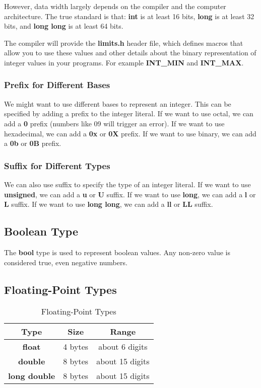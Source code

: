 \documentclass[a4paper,12pt]{article}
\begin{document}
However, data width largely depends on the compiler and the computer architecture.
The true standard is that: \textbf{int} is at least 16 bits, \textbf{long} is at least 32 bits, and \textbf{long long} is at least 64 bits.

The compiler will provide the \textbf{limits.h} header file, which defines macros that allow you to use these values and other details about the binary representation of integer values in your programs.
For example \textbf{INT\_MIN} and \textbf{INT\_MAX}.

\subsubsection{Prefix for Different Bases}

We might want to use different bases to represent an integer.
This can be specified by adding a prefix to the integer literal.
If we want to use octal, we can add a \textbf{0} prefix (numbers like 09 will trigger an error).
If we want to use hexadecimal, we can add a \textbf{0x} or \textbf{0X} prefix.
If we want to use binary, we can add a \textbf{0b} or \textbf{0B} prefix.

\subsubsection{Suffix for Different Types}

We can also use suffix to specify the type of an integer literal.
If we want to use \textbf{unsigned}, we can add a \textbf{u} or \textbf{U} suffix.
If we want to use \textbf{long}, we can add a \textbf{l} or \textbf{L} suffix.
If we want to use \textbf{long long}, we can add a \textbf{ll} or \textbf{LL} suffix.

\subsection{Boolean Type}

The \textbf{bool} type is used to represent boolean values.
Any non-zero value is considered true, even negative numbers.

\subsection{Floating-Point Types}

\begin{table}[H]
	\centering
	\begin{tabular}{|c|c|c|}
		\hline
		Type & Size & Range \\
		\hline
		\textbf{float} & 4 bytes & about 6 digits \\
		\hline
		\textbf{double} & 8 bytes & about 15 digits \\
		\hline
		\textbf{long double} & 8 bytes & about 15 digits \\
		\hline
	\end{tabular}
	\caption{Floating-Point Types}
\end{table}
\end{document}

